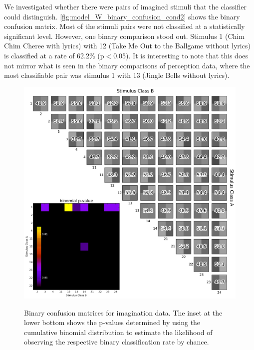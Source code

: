 We investigated whether there were pairs of imagined stimuli that the classifier could distinguish.
\autoref{fig:model_W_binary_confusion_cond2} shows the binary confusion matrix.
Most of the stimuli pairs were not classified at a statistically significant level. 
However, one binary comparison stood out. 
Stimulus 1 (Chim Chim Cheree with lyrics) with 12 (Take Me Out to the Ballgame without lyrics) is classified at a rate of 62.2\% (p$<$0.05). 
It is interesting to note that this does not mirror what is seen in the binary comparisons of perception data, where the most classifiable pair was stimulus 1 with 13 (Jingle Bells without lyrics). 
\begin{figure}[h] 
  \begin{center}
    \includegraphics[width=.75\textwidth,keepaspectratio=true]{Figures/model_W_binary_confusion_cond2}
   \\\vspace{-0.8em}
    \caption{Binary confusion matrices for imagination data.
    The inset at the lower bottom shows the p-values determined by using the cumulative binomial distribution to estimate the likelihood of observing the respective binary classification rate by chance.}
    \label{fig:model_W_binary_confusion_cond2}
  \end{center}
  \vspace{-1em}
\end{figure}
\newpage
